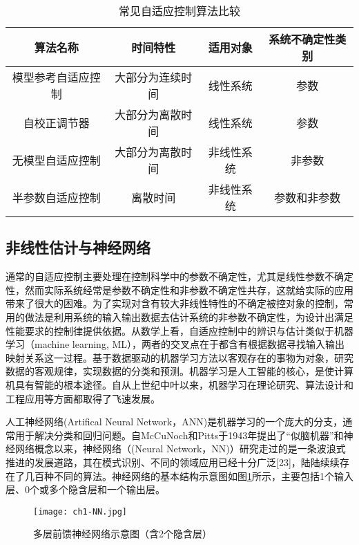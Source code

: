\begin{table}
\centering
\caption{常见自适应控制算法比较}\label{tab:adaptive}
\begin{tabular*}{0.9\textwidth}{@{\extracolsep{\fill}}cccc}
\toprule
算法名称		&时间特性	&适用对象	&系统不确定性类别 \\
\midrule
模型参考自适应控制		&大部分为连续时间	&线性系统&参数\\
自校正调节器		&大部分为离散时间	& 线性系统&参数\\
无模型自适应控制		&大部分为离散时间	&非线性系统&非参数\\
半参数自适应控制		&离散时间&非线性系统	&参数和非参数\\
\bottomrule
\end{tabular*}
\end{table}

\subsection{非线性估计与神经网络}%

通常的自适应控制主要处理在控制科学中的参数不确定性，尤其是线性参数不确定性，然而实际系统经常是参数不确定性和非参数不确定性共存，这就给实际的应用带来了很大的困难。为了实现对含有较大非线性特性的不确定被控对象的控制，常用的做法是利用系统的输入输出数据去估计系统的非参数不确定性，为设计出满足性能要求的控制律提供依据。从数学上看，自适应控制中的辨识与估计类似于机器学习（machine learning, ML），两者的交叉点在于都含有根据数据寻找输入输出映射关系这一过程。基于数据驱动的机器学习方法以客观存在的事物为对象，研究数据的客观规律，实现数据的分类和预测。机器学习是人工智能的核心，是使计算机具有智能的根本途径。自从上世纪中叶以来，机器学习在理论研究、算法设计和工程应用等方面都取得了飞速发展。

人工神经网络(Artifical Neural Network，ANN)是机器学习的一个庞大的分支，通常用于解决分类和回归问题。自McCuNoch和Pitts于1943年提出了“似脑机器”和神经网络概念以来，神经网络（(Neural Network，NN)）研究走过的是一条波浪式推进的发展道路，其在模式识别、不同的领域应用已经十分广泛[23]，陆陆续续存在了几百种不同的算法。神经网络的基本结构示意图如图\ref{fig:MNN}所示，主要包括1个输入层、0个或多个隐含层和一个输出层。

\begin{figure}
 \centering
 \texttt{[image: ch1-NN.jpg]}
 \caption{多层前馈神经网络示意图（含2个隐含层）}\label{fig:MNN}
\end{figure}


